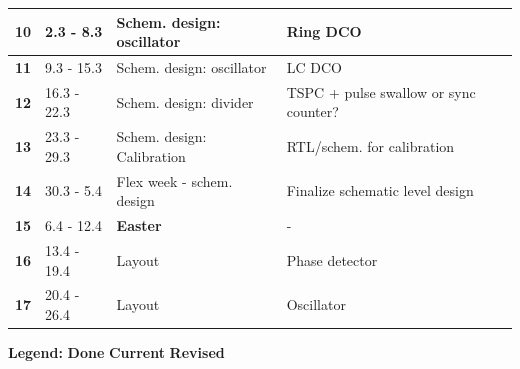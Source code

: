 \documentclass[t, screen, aspectratio=43]{beamer}
\begin{document}
\begin{frame}
\begin{table}[htb!]
\begin{tabular}{|c|l|l|l|}
			\hline 
			\rule[-1ex]{0pt}{2.5ex}\textbf{10}&2.3 - 8.3& Schem. design: oscillator & Ring DCO\\ 
			\hline 
			\rule[-1ex]{0pt}{2.5ex}\textbf{11}&9.3 - 15.3& Schem. design: oscillator & LC DCO\\ 
			\hline 
			\rule[-1ex]{0pt}{2.5ex}\textbf{12}&16.3 - 22.3& Schem. design: divider  &TSPC + pulse swallow or sync counter?\\ 
			\hline 
			\rule[-1ex]{0pt}{2.5ex}\textbf{13}&23.3 - 29.3&Schem. design: Calibration& RTL/schem. for calibration\\ 
			\hline 
			\rule[-1ex]{0pt}{2.5ex}\textbf{14}& 30.3 - 5.4 &  Flex week - schem. design & Finalize schematic level design\\ 
			\hline 
			\rule[-1ex]{0pt}{2.5ex}\textbf{15}& 6.4 - 12.4& {\color{red}\textbf{Easter}} & - \\ 
			\hline 
			\rule[-1ex]{0pt}{2.5ex}\textbf{16}& 13.4 - 19.4& Layout & Phase detector\\ 
			\hline 
			\rule[-1ex]{0pt}{2.5ex}\textbf{17}& 20.4 - 26.4& Layout & Oscillator\\ 
			\hline 
		\end{tabular}
		\begin{flushleft}\textbf{Legend:} \colorbox{red!20}{\textbf{Done}} \colorbox{green!20}{\textbf{Current}}  \colorbox{blue!20}{\textbf{Revised}}
		\end{flushleft}
	\end{table}   
\end{frame}
\end{document}
